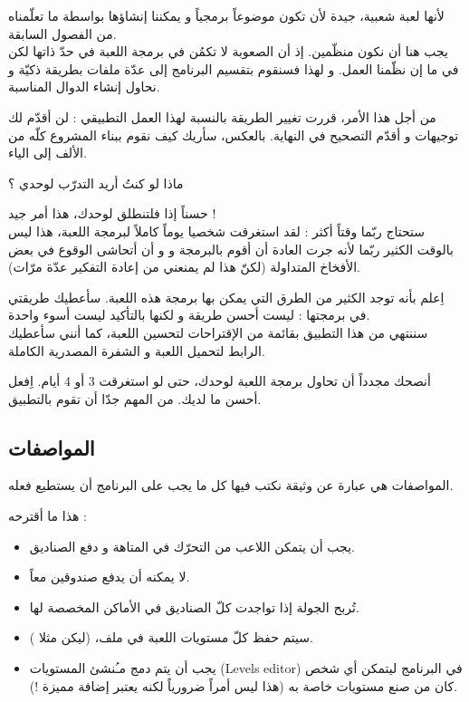 لأنها لعبة شعبية، جيدة لأن تكون موضوعاً برمجياً و يمكننا إنشاؤها بواسطة ما تعلّمناه من الفصول السابقة.\\
يجب هنا أن نكون منظّمين. إذ أن الصعوبة لا تكمُن في برمجة اللعبة في حدّ ذاتها لكن في ما إن نظّمنا العمل. و لهذا فسنقوم بتقسيم البرنامج إلى عدّة ملفات
بطريقة ذكيّة و نحاول إنشاء الدوال المناسبة.

من أجل هذا الأمر، قررت تغيير الطريقة بالنسبة لهذا العمل  التطبيقي : لن أقدّم لك توجيهات و أقدّم التصحيح في النهاية. بالعكس، سأريك كيف نقوم ببناء المشروع كلّه من الألف إلى الياء.

\begin{question}
ماذا لو كنتُ أريد التدرّب لوحدي ؟
\end{question}

حسناً إذا فلتنطلق لوحدك، هذا أمر جيد !\\
ستحتاج ربّما وقتاً أكثر : لقد استغرقت شخصيا يوماً كاملاً لبرمجة اللعبة، هذا ليس بالوقت الكثير ربّما لأنه جرت العادة أن أقوم بالبرمجة و و أن أتحاشى الوقوع في بعض الأفخاخ المتداولة (لكنّ هذا لم يمنعني من إعادة التفكير عدّة مرّات).

اِعلم بأنه توجد الكثير من الطرق التي يمكن بها برمجة هذه اللعبة. سأعطيك طريقتي في برمجتها : ليست أحسن طريقة و لكنها بالتأكيد ليست أسوء واحدة.\\
سننتهي من هذا التطبيق بقائمة من الإقتراحات لتحسين اللعبة، كما أنني سأعطيك الرابط لتحميل اللعبة و الشفرة المصدرية الكاملة.

أنصحك مجدداً أن تحاول برمجة اللعبة لوحدك، حتى لو استغرقت 3 أو 4 أيام. اِفعل أحسن ما لديك. من المهم جدّا أن تقوم بالتطبيق.

\subsection{المواصفات}

المواصفات هي عبارة عن وثيقة نكتب فيها كل ما يجب على البرنامج أن يستطيع فعله.

هذا ما أقترحه :

\begin{itemize}
	\item يجب أن يتمكن اللاعب من التحرّك في المتاهة و دفع الصناديق.
	\item لا يمكنه أن يدفع صندوقين معاً.
	\item تُربح الجولة إذا تواجدت كلّ الصناديق في الأماكن المخصصة لها.
	\item سيتم حفظ كلّ مستويات اللعبة في ملف، (ليكن مثلا 
	).
	\item يجب أن يتم دمج مـُنشئ المستويات 
	(\textenglish{Levels editor})
	في البرنامج ليتمكن أي شخص كان من صنع مستويات خاصة به (هذا ليس أمراً ضرورياً لكنه يعتبر إضافة مميزة !).
\end{itemize}

